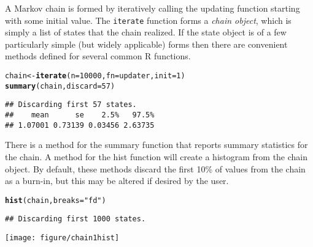 \documentclass{article}\usepackage[]{graphicx}\usepackage[]{color}
\makeatletter
\def\maxwidth{ %
  \ifdim\Gin@nat@width>\linewidth
    \linewidth
  \else
    \Gin@nat@width
  \fi
}
\newcommand{\hlnum}[1]{\textcolor[rgb]{0.686,0.059,0.569}{#1}}%
\newcommand{\hlstr}[1]{\textcolor[rgb]{0.192,0.494,0.8}{#1}}%
\newcommand{\hlstd}[1]{\textcolor[rgb]{0.345,0.345,0.345}{#1}}%
\newcommand{\hlkwb}[1]{\textcolor[rgb]{0.69,0.353,0.396}{#1}}%
\newcommand{\hlkwc}[1]{\textcolor[rgb]{0.333,0.667,0.333}{#1}}%
\newcommand{\hlkwd}[1]{\textcolor[rgb]{0.737,0.353,0.396}{\textbf{#1}}}%
\newenvironment{kframe}{%
 \def\at@end@of@kframe{}%
 \ifinner\ifhmode%
  \def\at@end@of@kframe{\end{minipage}}%
  \begin{minipage}{\columnwidth}%
 \fi\fi%
 \def\FrameCommand##1{\hskip\@totalleftmargin \hskip-\fboxsep
 \colorbox{shadecolor}{##1}\hskip-\fboxsep
     \hskip-\linewidth \hskip-\@totalleftmargin \hskip\columnwidth}%
 \MakeFramed {\advance\hsize-\width
   \@totalleftmargin\z@ \linewidth\hsize
   \@setminipage}}%
 {\par\unskip\endMakeFramed%
 \at@end@of@kframe}
\newenvironment{knitrout}{}{} %
\makeatother
\begin{document}
A Markov chain is formed by iteratively calling the updating function
starting with some initial value. The {\tt iterate} function forms a
{\it chain object}, which is simply a list of states that the chain
realized. If the state object is of a few particularly simple (but
widely applicable) forms then there are convenient methods defined for
several common R functions.
\begin{knitrout}
\color{fgcolor}\begin{kframe}
\begin{alltt}
\hlstd{chain} \hlkwb{<-} \hlkwd{iterate}\hlstd{(}\hlkwc{n} \hlstd{=} \hlnum{10000}\hlstd{,} \hlkwc{fn} \hlstd{= updater,} \hlkwc{init} \hlstd{=} \hlnum{1}\hlstd{)}
\hlkwd{summary}\hlstd{(chain,} \hlkwc{discard} \hlstd{=} \hlnum{57}\hlstd{)}
\end{alltt}
\begin{verbatim}
## Discarding first 57 states.
##    mean      se    2.5%   97.5% 
## 1.07001 0.73139 0.03456 2.63735
\end{verbatim}
\end{kframe}
\end{knitrout}


There is a method for the summary function that reports summary
statistics for the chain. A method for the hist function will create a
histogram from the chain object. By default, these methods discard the
first 10\% of values from the chain as a burn-in, but this may be
altered if desired by the user.
\begin{knitrout}
\color{fgcolor}\begin{kframe}
\begin{alltt}
\hlkwd{hist}\hlstd{(chain,} \hlkwc{breaks} \hlstd{=} \hlstr{"fd"}\hlstd{)}
\end{alltt}
\begin{verbatim}
## Discarding first 1000 states.
\end{verbatim}
\end{kframe}

{\centering \texttt{[image: figure/chain1hist]} 

}



\end{knitrout}
\end{document}
